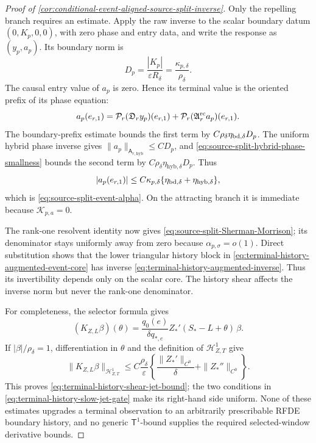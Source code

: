 \begin{proof}[Proof of
\cref{cor:conditional-event-aligned-source-split-inverse}]
Only the repelling branch requires an estimate.  Apply the raw inverse to
the scalar boundary datum \((0,K_p,0,0)\), with zero phase and entry data,
and write the response as \((y_p,a_p)\).  Its boundary norm is
\begin{equation*}
 D_p=\frac{|K_p|}{\varepsilon R_\delta}
     =\frac{\kappa_{p,\delta}}{\rho_\delta}.
\end{equation*}
The causal entry value of \(a_p\) is zero.  Hence its terminal value is
the oriented prefix of its phase equation:
\begin{equation}
 a_p(e_{r,1})
 =\mathcal P_r(\mathfrak D_ry_p)(e_{r,1})
   +\mathcal P_r(\mathfrak A_r^{\rm rc}a_p)(e_{r,1}).       \label{eq:proof-event-alpha-prefix}
\end{equation}
The boundary-prefix estimate bounds the first term by
\(C\rho_\delta\eta_{{\rm bd},\delta}D_p\).  The uniform hybrid phase
inverse gives \(\|a_p\|_{\mathsf A_{r,\mathrm{hyb}}}\le CD_p\), and
\cref{eq:source-split-hybrid-phase-smallness} bounds the second term by
\(C\rho_\delta\eta_{\mathrm{hyb},\delta}D_p\).  Thus
\begin{equation*}
 |a_p(e_{r,1})|
 \le C\kappa_{p,\delta}
       \{\eta_{{\rm bd},\delta}
           +\eta_{\mathrm{hyb},\delta}\},
\end{equation*}
which is \cref{eq:source-split-event-alpha}.  On the attracting branch it
is immediate because \(\mathcal K_{p,a}=0\).

The rank-one resolvent identity now gives
\cref{eq:source-split-Sherman-Morrison}; its denominator stays uniformly
away from zero because \(\alpha_{p,\sigma}=o(1)\).  Direct substitution
shows that the lower triangular history block in
\cref{eq:terminal-history-augmented-event-core} has inverse
\cref{eq:terminal-history-augmented-inverse}.  Thus its invertibility
depends only on the scalar core.  The history shear affects the inverse
norm but never the rank-one denominator.

For completeness, the selector formula gives
\begin{equation*}
 (K_{Z,L}\beta)(\theta)
 =\frac{q_0(e)}{\delta q_{*,e}}
       Z_*'(S_*-L+\theta)\,\beta.
\end{equation*}
If \(|\beta|/\rho_\delta=1\), differentiation in \(\theta\) and the
definition of \(\mathcal H_{Z,T}^1\) give
\begin{equation*}
 \|K_{Z,L}\beta\|_{\mathcal H_{Z,T}^1}
 \le C\frac{\rho_\delta}{\varepsilon}
   \left\{\frac{\|Z_*'\|_{C^0}}{\delta}
                  +\|Z_*''\|_{C^0}\right\}.
\end{equation*}
This proves \cref{eq:terminal-history-shear-jet-bound}; the two conditions
in \cref{eq:terminal-history-slow-jet-gate} make its right-hand side
uniform.  None of these estimates upgrades a terminal observation to an
arbitrarily prescribable RFDE boundary history, and no generic
\(\mathsf T^1\)-bound supplies the required selected-window derivative
bounds.
\end{proof}

